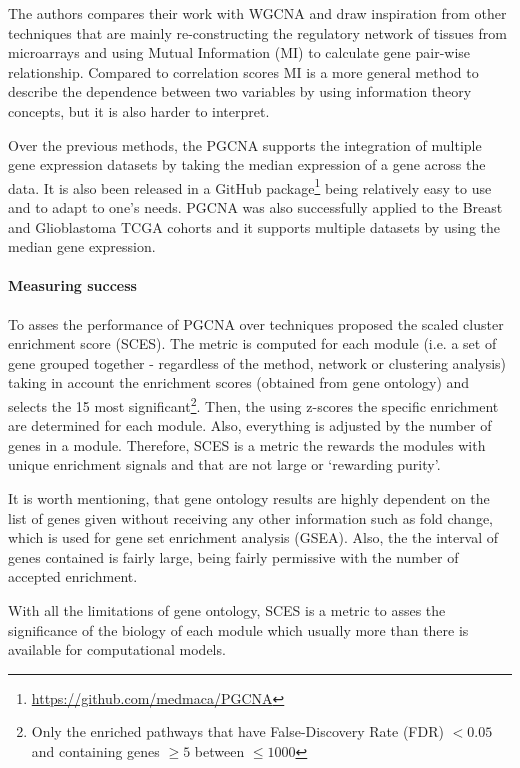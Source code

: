 The authors compares their work with WGCNA and draw inspiration from other techniques that are mainly re-constructing the regulatory network of tissues from microarrays and using Mutual Information (MI) \citet{Margolin2006-mc,Zhang2013-fs} to calculate gene pair-wise relationship. Compared to correlation scores MI is a more general method to describe the dependence between two variables by using information theory concepts, but it is also harder to interpret.

Over the previous methods, the PGCNA supports the integration of multiple gene expression datasets by taking the median expression of a gene across the data. It is also been released in a GitHub package\footnote{\url{https://github.com/medmaca/PGCNA} } being relatively easy to use and to adapt to one's needs. PGCNA was also successfully applied to the Breast and Glioblastoma TCGA cohorts and it supports multiple datasets by using the median gene expression.

\paragraph{Measuring success}

To asses the performance of PGCNA over techniques \citet{Care2019-ij} proposed the scaled cluster enrichment score (SCES). The metric is computed for each module (i.e. a set of gene grouped together - regardless of the method, network or clustering analysis) taking in account the enrichment scores (obtained from gene ontology) and selects the 15 most significant\footnote{Only the enriched pathways that have False-Discovery Rate (FDR) $<0.05$ and containing genes $\geq5$ between $\leq1000$}. Then, the using z-scores the specific enrichment are determined for each module. Also, everything is adjusted by the number of genes in a module. Therefore, SCES is a metric the rewards the modules with unique enrichment signals and that are not large or ‘rewarding purity'\cite{Care2019-ij}.

It is worth mentioning, that gene ontology results are highly dependent on the list of genes given without receiving any other information such as fold change, which is used for gene set enrichment analysis (GSEA). Also, the the interval of genes contained is fairly large, being fairly permissive with the number of accepted enrichment.

With all the limitations of gene ontology, SCES is a metric to asses the significance of the biology of each module which usually more than there is available for computational models.

